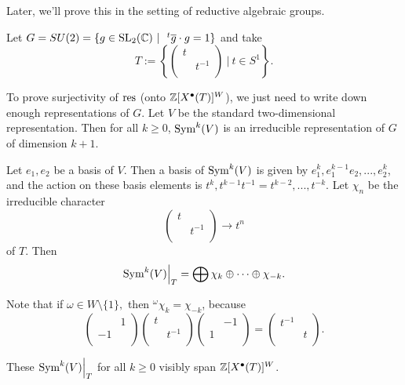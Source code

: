 Later, we'll prove this in the setting of reductive algebraic groups.

\begin{exmpl}
Let $G = SU(2) = \{g \in \sl 2 \cmplx \ | \ \ ^t \conj{g} \cdot g = 1 \}$ and
take \[ T := \left\{ \left(\begin{matrix}
t & \\
  & t^{-1} \\
\end{matrix}\right) \ | \ t \in S^1 \right\}. \]

To prove surjectivity of $\operatorname{res}$ (onto $\mathbb{Z}[X^\bullet(T)]^W$), we just need to
write down enough representations of $G$. Let $V$ be the standard 
two-dimensional representation. Then for all $k \ge 0$, $\operatorname{Sym}^k(V)$ is an
irreducible representation of $G$ of dimension $k + 1$.

Let $e_1, e_2$ be a basis of $V$. Then a basis of $\operatorname{Sym}^k(V)$ is given by
$e_1^k, e_1^{k - 1} e_2, ..., e_2^k$, and the action on these basis elements
is $t^k, t^{k - 1}t^{-1} = t^{k - 2}, ..., t^{-k}$. Let $\chi_n$ be the
irreducible character
\[ \left(\begin{matrix}
t & \\
  & t^{-1} \\
\end{matrix}\right) \rightarrow t^n \]
of $T$. Then 
\[ \restr{\op{Sym}^k(V)}{T} = \bigoplus \chi_k \oplus \cdots \oplus \chi_{-k}.\]

Note that if $\omega \in W \setminus \{ 1 \},$ then
$^\omega \chi_k = \chi_{-k}$, because
\[ \left(\begin{matrix}
& 1 \\
-1 & \\
\end{matrix}\right) \left(\begin{matrix}
t & \\
& t^{-1} \\
\end{matrix}\right) \left(\begin{matrix}
& -1 \\
1 & \\
\end{matrix}\right) = \left(\begin{matrix}
t^{-1} & \\
& t \\
\end{matrix}\right). \]

These $\restr{\op{Sym}^k(V)}{T}$ for all $k \ge 0$ visibly span
$\mathbb{Z}[X^\bullet(T)]^W$.
\end{exmpl}
